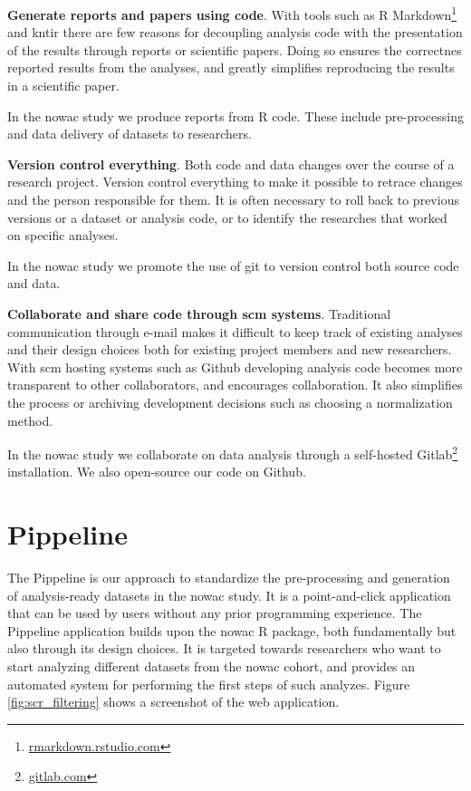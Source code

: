 \textbf{Generate reports and papers using code}. With tools such as R
Markdown\footnote{\url{rmarkdown.rstudio.com}}
and kntir there are few reasons for decoupling analysis code with the
presentation of the results through reports or scientific papers. Doing so
ensures the correctnes reported results from the analyses, and greatly
simplifies reproducing the results in a scientific paper. 

In the \gls{nowac} study we produce reports from R code. These include
pre-processing and data delivery of datasets to researchers. 

\textbf{Version control everything}. Both code and data changes over the course
of a research project. Version control everything to make it possible to retrace
changes and the person responsible for them. It is often necessary to roll back
to previous versions or a dataset or analysis code, or to identify the
researches that worked on specific analyses. 

In the \gls{nowac} study we promote the use of git to version control both
source code and data. 

\textbf{Collaborate and share code through \gls{scm} systems}. Traditional
communication through e-mail makes it difficult to keep track of existing
analyses and their design choices both for existing project members and new
researchers. With \gls{scm} hosting systems such as Github developing
analysis code becomes more transparent to other collaborators, and encourages
collaboration. It also simplifies the process or archiving development decisions
such as choosing a normalization method.

In the \gls{nowac} study we collaborate on data analysis through a self-hosted
Gitlab\footnote{\url{gitlab.com}} installation. We also open-source our code on
Github. 



\section{Pippeline}
The Pippeline is our approach to standardize the pre-processing and generation
of analysis-ready datasets in the \gls{nowac} study. It is a point-and-click
application that can be used by users without any prior programming experience.
The Pippeline application builds upon the \gls{nowac} R package, both
fundamentally but also through its design choices. It is targeted towards
researchers who want to start analyzing different datasets from the \gls{nowac}
cohort, and provides an automated system for performing the first steps of such
analyzes. 
Figure \ref{fig:scr_filtering} shows a screenshot of the web application.

